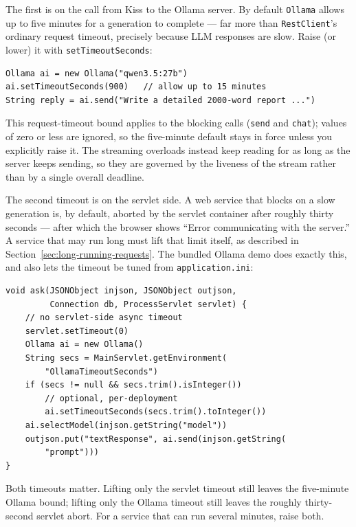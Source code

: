 The first is on the call from Kiss to the Ollama server.  By default
\texttt{Ollama} allows up to five minutes for a generation to complete --- far
more than \texttt{RestClient}'s ordinary request timeout, precisely because LLM
responses are slow.  Raise (or lower) it with \texttt{setTimeoutSeconds}:

\begin{lstlisting}[style=groovy]
Ollama ai = new Ollama("qwen3.5:27b")
ai.setTimeoutSeconds(900)   // allow up to 15 minutes
String reply = ai.send("Write a detailed 2000-word report ...")
\end{lstlisting}

\noindent
This request-timeout bound applies to the blocking calls (\texttt{send} and
\texttt{chat}); values of zero or less are ignored, so the five-minute default
stays in force unless you explicitly raise it.  The streaming overloads instead
keep reading for as long as the server keeps sending, so they are governed by the
liveness of the stream rather than by a single overall deadline.

The second timeout is on the servlet side.  A web service that blocks on a slow
generation is, by default, aborted by the servlet container after roughly thirty
seconds --- after which the browser shows ``Error communicating with the
server.''  A service that may run long must lift that limit itself, as described
in Section~\ref{sec:long-running-requests}.  The bundled Ollama demo does exactly
this, and also lets the timeout be tuned from \texttt{application.ini}:

\begin{lstlisting}[style=groovy]
void ask(JSONObject injson, JSONObject outjson,
         Connection db, ProcessServlet servlet) {
    // no servlet-side async timeout
    servlet.setTimeout(0)
    Ollama ai = new Ollama()
    String secs = MainServlet.getEnvironment(
        "OllamaTimeoutSeconds")
    if (secs != null && secs.trim().isInteger())
        // optional, per-deployment
        ai.setTimeoutSeconds(secs.trim().toInteger())
    ai.selectModel(injson.getString("model"))
    outjson.put("textResponse", ai.send(injson.getString(
        "prompt")))
}
\end{lstlisting}

\begin{warnbox}
Both timeouts matter.  Lifting only the servlet timeout still leaves the
five-minute Ollama bound; lifting only the Ollama timeout still leaves the
roughly thirty-second servlet abort.  For a service that can run several minutes,
raise both.
\end{warnbox}

